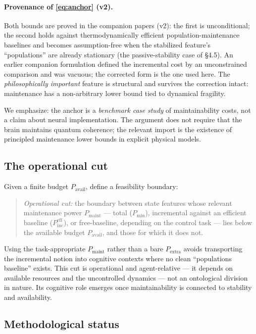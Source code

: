 \documentclass[11pt,a4paper]{article}
\newcommand{\Pextra}{P_{\mathrm{extra}}}
\newcommand{\Pmin}{P_{\min}}
\newcommand{\Pavail}{P_{\mathrm{avail}}}
\begin{document}
\paragraph{Provenance of \eqref{eq:anchor} (v2).} Both bounds are proved in
the companion papers \cite{Work,Anchor} (v2): the first is unconditional; the
second holds against thermodynamically efficient population-maintenance
baselines and becomes assumption-free when the stabilized feature's
``populations'' are already stationary (the passive-stability case of
\S4.5). An earlier companion formulation defined the incremental cost by an
unconstrained comparison and was vacuous; the corrected form is the one used
here. The
\emph{philosophically important} feature is structural and survives the
correction intact: maintenance has a non-arbitrary lower bound tied to
dynamical fragility.

We emphasize: the anchor is a \emph{benchmark case study} of maintainability
costs, not a claim about neural implementation. The argument does not require
that the brain maintains quantum coherence; the relevant import is the
existence of principled maintenance lower bounds in explicit physical models.

\subsection{The operational cut}

Given a finite budget $\Pavail$, define a feasibility boundary:
\begin{quote}
\emph{Operational cut:} the boundary between state features whose relevant
maintenance power $P_{\mathrm{maint}}$ --- total ($\Pmin$), incremental
against an efficient baseline ($P^{\mathrm{eff}}_{\mathrm{inc}}$), or
free-baseline, depending on the control task --- lies below the available
budget $\Pavail$, and those for which it does not.
\end{quote}
Using the task-appropriate $P_{\mathrm{maint}}$ rather than a bare
$\Pextra$ avoids transporting the incremental notion into cognitive contexts
where no clean ``populations baseline'' exists.
This cut is operational and agent-relative --- it depends on available
resources and the uncontrolled dynamics --- not an ontological division in
nature. Its cognitive role emerges once maintainability is connected to
stability and availability.

\subsection{Methodological status}
\end{document}
